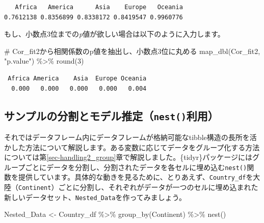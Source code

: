 \documentclass[
  a4paper,
  pandoc,
  ja=standard,
  jafont=haranoaji]{bxjsbook}
\newenvironment{Shaded}{\begin{snugshade}}{\end{snugshade}}
\newcommand{\CommentTok}[1]{\textcolor[rgb]{0.37,0.37,0.37}{#1}}
\newcommand{\DecValTok}[1]{\textcolor[rgb]{0.68,0.00,0.00}{#1}}
\newcommand{\FunctionTok}[1]{\textcolor[rgb]{0.28,0.35,0.67}{#1}}
\newcommand{\NormalTok}[1]{\textcolor[rgb]{0.00,0.48,0.65}{#1}}
\newcommand{\OtherTok}[1]{\textcolor[rgb]{0.00,0.48,0.65}{#1}}
\newcommand{\SpecialCharTok}[1]{\textcolor[rgb]{0.37,0.37,0.37}{#1}}
\newcommand{\StringTok}[1]{\textcolor[rgb]{0.13,0.47,0.30}{#1}}
\begin{document}
\begin{verbatim}
   Africa   America      Asia    Europe   Oceania 
0.7612138 0.8356899 0.8338172 0.8419547 0.9960776 
\end{verbatim}

もし、小数点3位までの\emph{p}値が欲しい場合は以下のように入力します。

\begin{Shaded}
\begin{Highlighting}[numbers=left,,]
\CommentTok{\# Cor\_fit2から相関係数のp値を抽出し、小数点3位に丸める}
\FunctionTok{map\_dbl}\NormalTok{(Cor\_fit2, }\StringTok{"p.value"}\NormalTok{) }\SpecialCharTok{\%\textgreater{}\%} \FunctionTok{round}\NormalTok{(}\DecValTok{3}\NormalTok{)}
\end{Highlighting}
\end{Shaded}

\begin{verbatim}
 Africa America    Asia  Europe Oceania 
  0.000   0.000   0.000   0.000   0.004 
\end{verbatim}

\hypertarget{sec-iteration_split2}{%
\subsection{\texorpdfstring{サンプルの分割とモデル推定（\texttt{nest()}利用）}{サンプルの分割とモデル推定（nest()利用）}}\label{sec-iteration_split2}}

それではデータフレーム内にデータフレームが格納可能なtibble構造の長所を活かした方法について解説します。ある変数に応じてデータをグループ化する方法については第\ref{sec-handling2_group}章で解説しました。\{tidyr\}パッケージにはグループごとにデータを分割し、分割されたデータを各セルに埋め込む\texttt{nest()}関数を提供しています。具体的な動きを見るために、とりあえず、\texttt{Country\_df}を大陸（\texttt{Continent}）ごとに分割し、それぞれがデータが一つのセルに埋め込まれた新しいデータセット、\texttt{Nested\_Data}を作ってみましょう。

\begin{Shaded}
\begin{Highlighting}[numbers=left,,]
\NormalTok{Nested\_Data }\OtherTok{\textless{}{-}}\NormalTok{ Country\_df }\SpecialCharTok{\%\textgreater{}\%} 
  \FunctionTok{group\_by}\NormalTok{(Continent) }\SpecialCharTok{\%\textgreater{}\%}
  \FunctionTok{nest}\NormalTok{()}
\end{Highlighting}
\end{Shaded}
\end{document}
